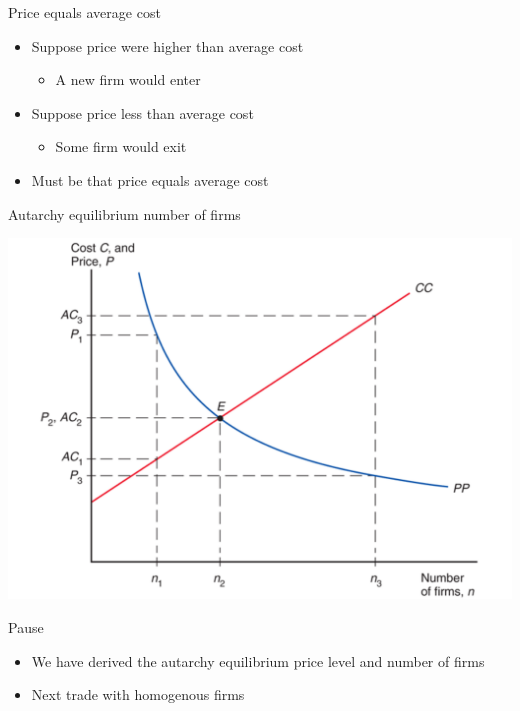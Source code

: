 \documentclass[ignorenonframetext,]{beamer}
\begin{document}
\begin{frame}{Price equals average cost} 

    \begin{itemize}
        \item Suppose price were higher than average cost 
            \begin{itemize}
                \item A new firm would enter
            \end{itemize}
        \item Suppose price less than average cost
            \begin{itemize}
                \item Some firm would exit
            \end{itemize}
        \item Must be that price equals average cost
    \end{itemize}

\end{frame}

\begin{frame}{Autarchy equilibrium number of firms}
    
    \includegraphics[scale=0.25]{autequil.png}

\end{frame}

\begin{frame}{Pause}

\begin{itemize}
    \item We have derived the autarchy equilibrium price level and number of firms
    \item Next trade with homogenous firms
\end{itemize}

\end{frame}
\end{document}
